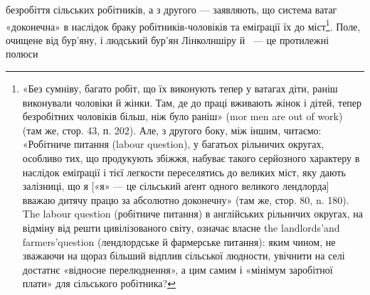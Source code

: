 \parcont{}  %
безробіття сільських робітників, а з другого — заявляють, що
система ватаг «доконечна» в наслідок браку робітників-чоловіків
та еміґрації їх до міст\footnote{
«Без сумніву, багато робіт, що їх виконують тепер у ватагах
діти, раніш виконували чоловіки й жінки. Там, де до праці вживають
жінок і дітей, тепер безробітних чоловіків більш, ніж було раніш» (mor
men are out of work) (там же, стор. 43, п. 202). Але, з другого боку, між
іншим, читаємо: «Робітниче питання (labour question), у багатьох рільничих
округах, особливо тих, що продукують збіжжя, набуває такого
серйозного характеру в наслідок еміґрації і тієї легкости переселятись
до великих міст, яку дають залізниці, що я [«я» — це сільський аґент
одного великого лендлорда] вважаю дитячу працю за абсолютно доконечну»
(там же, стор. 80, n. 180). The labour question (робітниче питання)
в англійських рільничих округах, на відміну від решти цивілізованого
світу, означає власне the landlords’and farmers’question (лендлордське
й фармерське питання): яким чином, не зважаючи на щораз більший
відплив сільської людности, увічнити на селі достатнє «відносне перелюднення»,
а цим самим і «мінімум заробітної плати» для сільського
робітника?
}. Поле, очищене від бур’яну, і людський
бур’ян Лінколншіру й~ — це протилежні полюси
